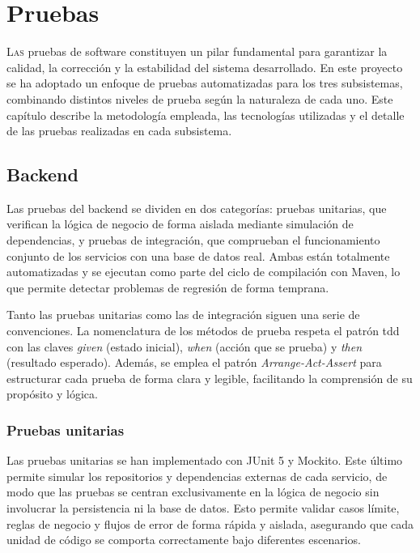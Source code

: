 \chapter{Pruebas}
\label{chap:probas}

\lettrine{L}{as} pruebas de software constituyen un pilar fundamental para garantizar la calidad, la corrección y la estabilidad del sistema desarrollado. En este proyecto se ha adoptado un enfoque de pruebas automatizadas para los tres subsistemas, combinando distintos niveles de prueba según la naturaleza de cada uno. Este capítulo describe la metodología empleada, las tecnologías utilizadas y el detalle de las pruebas realizadas en cada subsistema.

\section{Backend}

Las pruebas del backend se dividen en dos categorías: pruebas unitarias, que verifican la lógica de negocio de forma aislada mediante simulación de dependencias, y pruebas de integración, que comprueban el funcionamiento conjunto de los servicios con una base de datos real. Ambas están totalmente automatizadas y se ejecutan como parte del ciclo de compilación con Maven, lo que permite detectar problemas de regresión de forma temprana.

Tanto las pruebas unitarias como las de integración siguen una serie de convenciones. La nomenclatura de los métodos de prueba respeta el patrón \acrfull{tdd} con las claves \textit{given} (estado inicial), \textit{when} (acción que se prueba) y \textit{then} (resultado esperado). Además, se emplea el patrón \textit{Arrange-Act-Assert} para estructurar cada prueba de forma clara y legible, facilitando la comprensión de su propósito y lógica. 

\subsection{Pruebas unitarias}

Las pruebas unitarias se han implementado con JUnit 5 y Mockito. Este último permite simular los repositorios y dependencias externas de cada servicio, de modo que las pruebas se centran exclusivamente en la lógica de negocio sin involucrar la persistencia ni la base de datos. Esto permite validar casos límite, reglas de negocio y flujos de error de forma rápida y aislada, asegurando que cada unidad de código se comporta correctamente bajo diferentes escenarios. 

